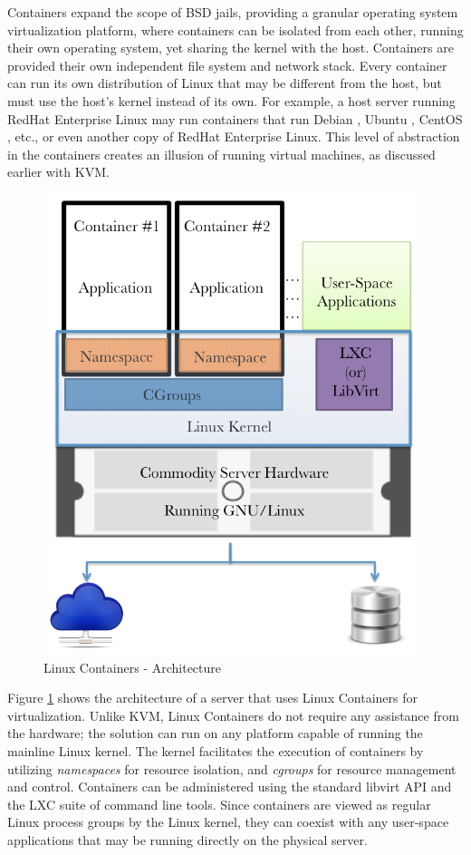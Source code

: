 Containers expand the scope of BSD jails, providing a granular operating system virtualization platform, where containers can be isolated from each other, running their own operating system, yet sharing the kernel with the host. Containers are provided their own independent file system and network stack. Every container can run its own distribution of Linux that may be different from the host, but must use the host's kernel instead of its own. For example, a host server running RedHat Enterprise Linux \cite{rhel} may run containers that run Debian \cite{debian}, Ubuntu \cite{ubuntu}, CentOS \cite{centos}, etc., or even another copy of RedHat Enterprise Linux. This level of abstraction in the containers creates an illusion of running virtual machines, as discussed earlier with KVM.  

\begin{figure}[H]
\centering
\includegraphics[width=110mm]{lxc-arch.png}
\caption{Linux Containers - Architecture}
\label{img_lxc_arch}
\end{figure}

Figure \ref{img_lxc_arch} shows the architecture of a server that uses Linux Containers for virtualization. Unlike KVM, Linux Containers do not require any assistance from the hardware; the solution can run on any platform capable of running the mainline Linux kernel. The kernel facilitates the execution of containers by utilizing \emph{namespaces} for resource isolation, and \emph{cgroups} for resource management and control. Containers can be administered using the standard libvirt API and the LXC suite of command line tools. Since containers are viewed as regular Linux process groups by the Linux kernel, they can coexist with any user-space applications that may be running directly on the physical server. 

